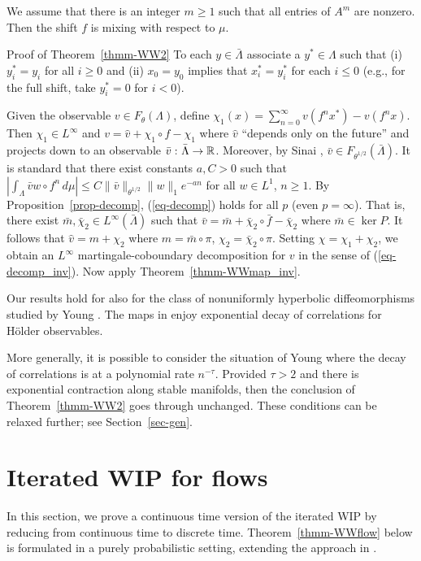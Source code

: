 \documentclass[aop,MSNbibl,seceqn,dvips]{arximspdf}
\newcommand{\eqref}[1]{(\ref{#1})}
\newcommand{\R}{\mathbb{R}}
\begin{document}
We assume that
there is an integer $m\ge1$ such that all entries of $A^m$ are nonzero.
Then the shift $f$ is mixing with respect to $\mu$.

\begin{pf*}{Proof of Theorem~\ref{thmm-WW2}}
To each $y\in\bar\Lambda$ associate a $y^*\in\Lambda$ such that
(i)~$y^*_i=y_i$ for all $i\ge0$ and
(ii) $x_0=y_0$ implies that $x^*_i=y^*_i$ for each $i\le0$
(e.g., for the full shift, take
$y^*_i=0$ for $i<0$).

Given the observable $v\in F_\theta(\Lambda)$,
define $\chi_1(x)=\sum_{n=0}^\infty v(f^n x^*)-v(f^nx)$.
Then $\chi_1\in L^\infty$ and $v=\hat v+\chi_1\circ f-\chi_1$
where $\hat v$ ``depends only on the future''
and projects down to an observable $\bar v\dvtx\bar\Lambda\to\R$.
Moreover, by Sinai \cite{Sinai72}, $\bar v \in F_{\theta^{1/2}}(\bar
\Lambda)$.
It is standard that there exist constants $a,C>0$ such that $|\int_{\Lambda}\bar v w\circ f^n \,d\mu|\le C\|\bar v\|_{\theta^{1/2}}\|w\|
_1 e^{-an}$ for all $w\in L^1$, $n\ge1$.
By Proposition~\ref{prop-decomp}, \eqref{eq-decomp} holds for all $p$
(even $p=\infty$).
That is, there exist $\bar m,\bar\chi_2\in L^\infty(\bar\Lambda)$
such that
$\bar v=\bar m+\bar\chi_2\circ\bar f-\bar\chi_2$ where
$\bar m\in\ker P$.
It follows that $\hat v=m+\chi_2$ where $m=\bar m\circ\pi$, $\chi
_2=\bar
\chi_2\circ\pi$. Setting $\chi=\chi_1+\chi_2$, we obtain
an $L^\infty$ martingale-coboundary decomposition for $v$ in the sense
of \eqref{eq-decomp_inv}.
Now apply Theorem~\ref{thmm-WWmap_inv}.
\end{pf*}

Our results hold for also for the class of nonuniformly hyperbolic
diffeomorphisms studied by Young \cite{Young98}.
The maps in \cite{Young98} enjoy exponential decay of correlations for
H\"older observables.

More generally, it is possible to consider the situation of Young \cite
{Young99} where the decay of correlations is at a polynomial rate
$n^{-\tau}$.
Provided $\tau>2$ and there is exponential contraction along stable manifolds,
then the conclusion of Theorem~\ref{thmm-WW2} goes through unchanged.
These conditions can be relaxed further; see Section~\ref{sec-gen}.

\section{Iterated WIP for flows}
\label{sec-flow}

In this section, we prove a continuous time version of the iterated WIP
by reducing from continuous time to discrete time.
Theorem~\ref{thmm-WWflow} below is formulated in a purely probabilistic
setting, extending the approach in \cite{MT04,Gouezel07,MZapp}.
\end{document}
